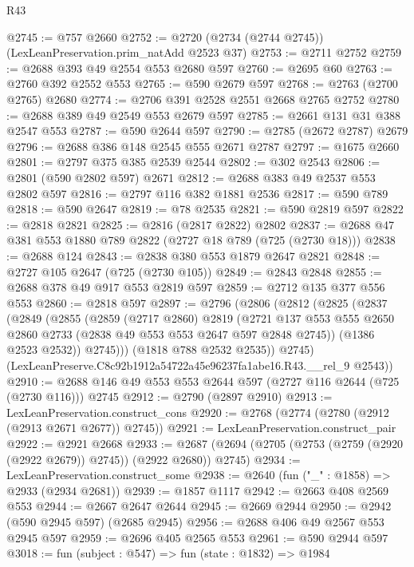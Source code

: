 \begin{lexlean}{R43}
\begin{coremodule}
@2745 := @757 @2660
@2752 := @2720 (@2734 (@2744 @2745)) (LexLeanPreservation.prim_natAdd @2523 @37)
@2753 := @2711 @2752
@2759 := @2688 @393 @49 @2554 @553 @2680 @597
@2760 := @2695 @60
@2763 := @2760 @392 @2552 @553
@2765 := @590 @2679 @597
@2768 := @2763 (@2700 @2765) @2680
@2774 := @2706 @391 @2528 @2551 @2668 @2765 @2752
@2780 := @2688 @389 @49 @2549 @553 @2679 @597
@2785 := @2661 @131 @31 @388 @2547 @553
@2787 := @590 @2644 @597
@2790 := @2785 (@2672 @2787) @2679
@2796 := @2688 @386 @148 @2545 @555 @2671 @2787
@2797 := @1675 @2660
@2801 := @2797 @375 @385 @2539 @2544
@2802 := @302 @2543
@2806 := @2801 (@590 @2802 @597) @2671
@2812 := @2688 @383 @49 @2537 @553 @2802 @597
@2816 := @2797 @116 @382 @1881 @2536
@2817 := @590 @789
@2818 := @590 @2647
@2819 := @78 @2535
@2821 := @590 @2819 @597
@2822 := @2818 @2821
@2825 := @2816 (@2817 @2822) @2802
@2837 := @2688 @47 @381 @553 @1880 @789 @2822 (@2727 @18 @789 (@725 (@2730 @18)))
@2838 := @2688 @124
@2843 := @2838 @380 @553 @1879 @2647 @2821
@2848 := @2727 @105 @2647 (@725 (@2730 @105))
@2849 := @2843 @2848
@2855 := @2688 @378 @49 @917 @553 @2819 @597
@2859 := @2712 @135 @377 @556 @553
@2860 := @2818 @597
@2897 := @2796
    (@2806
      (@2812
        (@2825
          (@2837
            (@2849
              (@2855
                (@2859
                  (@2717 @2860)
                  @2819
                  (@2721
                    @137
                    @553
                    @555
                    @2650
                    @2860
                    @2733
                    (@2838 @49 @553 @553 @2647 @597 @2848 @2745))
                  (@1386 @2523 @2532))
                @2745)))
          (@1818 @788 @2532 @2535))
        @2745)
      (LexLeanPreserve.C8c92b1912a54722a45e96237fa1abe16.R43.__rel_9 @2543))
@2910 := @2688 @146 @49 @553 @553 @2644 @597 (@2727 @116 @2644 (@725 (@2730 @116))) @2745
@2912 := @2790 (@2897 @2910)
@2913 := LexLeanPreservation.construct_cons
@2920 := @2768 (@2774 (@2780 (@2912 (@2913 @2671 @2677)) @2745))
@2921 := LexLeanPreservation.construct_pair
@2922 := @2921 @2668
@2933 := @2687 (@2694 (@2705 (@2753 (@2759 (@2920 (@2922 @2679)) @2745)) (@2922 @2680)) @2745)
@2934 := LexLeanPreservation.construct_some
@2938 := @2640 (fun ("_" : @1858) => @2933 (@2934 @2681))
@2939 := @1857 @1117
@2942 := @2663 @408 @2569 @553
@2944 := @2667 @2647 @2644
@2945 := @2669 @2944
@2950 := @2942 (@590 @2945 @597) (@2685 @2945)
@2956 := @2688 @406 @49 @2567 @553 @2945 @597
@2959 := @2696 @405 @2565 @553
@2961 := @590 @2944 @597
@3018 := fun (subject : @547) =>
  fun (state : @1832) =>
  @1984

\end{coremodule}
\end{lexlean}

